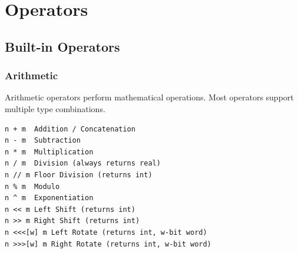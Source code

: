 \chapter{Operators}
\label{sec:operators}

\section{Built-in Operators}

\subsection{Arithmetic}
Arithmetic operators perform mathematical operations. Most operators support multiple type combinations.
\begin{verbatim}
n + m  Addition / Concatenation
n - m  Subtraction
n * m  Multiplication
n / m  Division (always returns real)
n // m Floor Division (returns int)
n % m  Modulo
n ^ m  Exponentiation
n << m Left Shift (returns int)
n >> m Right Shift (returns int)
n <<<[w] m Left Rotate (returns int, w-bit word)
n >>>[w] m Right Rotate (returns int, w-bit word)
\end{verbatim}


